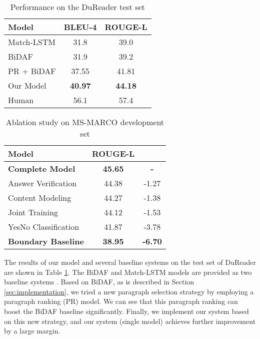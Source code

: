 \documentclass[11pt,a4paper]{article}
\newcommand{\tabref}[1]{Table \ref{#1}}
\newcommand{\secref}[1]{Section \ref{#1}}
\begin{document}
\begin{table}[tbp]
\centering
\begin{tabular}{|l|c|c|}
\hline
Model        & BLEU-4 & ROUGE-L \\ \hline
Match-LSTM   & 31.8   & 39.0  \\ 
BiDAF        & 31.9   & 39.2  \\
PR + BiDAF   & 37.55   & 41.81  \\ 
Our Model    & \textbf{40.97}   &  \textbf{44.18} \\ \hline
Human          & 56.1 & 57.4 \\ \hline
\end{tabular}
\caption{Performance on the DuReader test set}
\label{tab:dureader-results}
\end{table}

\begin{table}[tbp]
\centering
\begin{tabular}{|l|c|c|}
\hline
Model           & ROUGE-L &  \\ \hline
\textbf{Complete Model}      & \textbf{45.65}   &  \textbf{-} \\
 \- Answer Verification  &  44.38  & -1.27  \\
 \- Content Modeling   & 44.27   & -1.38  \\
 \- Joint Training  & 44.12   & -1.53         \\
 \- YesNo Classification &  41.87  &  -3.78 \\ 
\textbf{Boundary Baseline}   &  \textbf{38.95}  &  \textbf{-6.70} \\ \hline
\end{tabular}
\caption{Ablation study on MS-MARCO development set}
\label{tab:ablation}
\end{table}

The results of our model and several baseline systems on the test set of DuReader are shown in \tabref{tab:dureader-results}. The BiDAF and Match-LSTM models are provided as two baseline systems \cite{dureader}. Based on BiDAF, as is described in \secref{sec:implementation}, we tried a new paragraph selection strategy by employing a paragraph ranking (PR) model. We can see that this paragraph ranking can boost the BiDAF baseline significantly. Finally, we implement our system based on this new strategy, and our system (single model) achieves further improvement by a large margin.
\end{document}
